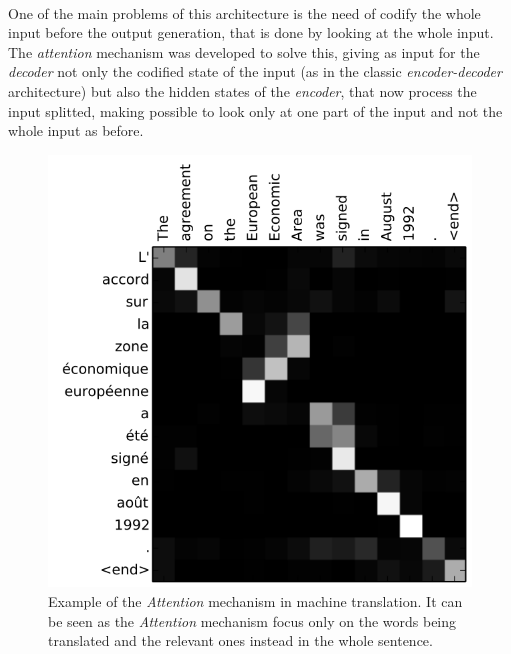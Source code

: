 \paragraph{}
One of the main problems of this architecture is the need of codify the whole input before the output generation, that is done by looking at the whole input. The \emph{attention} mechanism was developed to solve this, giving as input for the \emph{decoder} not only the codified state of the input (as in the classic \emph{encoder-decoder} architecture) but also the hidden states of the \emph{encoder}, that now process the input splitted, making possible to look only at one part of the input and not the whole input as before.\cite{Bahdanau2014} 
\begin{figure}[h!]
	\centering
	\includegraphics[scale=0.35]{images/attention}
	\caption{Example of the \emph{Attention} mechanism in machine translation. It can be seen as the \emph{Attention} mechanism focus only on the words being translated and the relevant ones instead in the whole sentence.}
	\label{fig:attention}
\end{figure}
